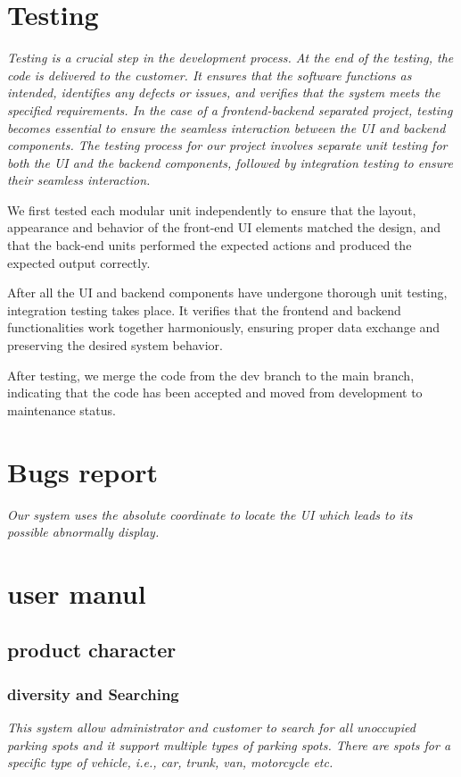 {	\section{Testing}
	{\slshape \selectfont
		Testing is a crucial step in the development process. At the end of the
		testing, the code is delivered to the customer. It ensures that the
		software functions as intended, identifies any defects or issues, and
		verifies that the system meets the specified requirements. In the case
		of a frontend-backend separated project, testing becomes essential to
		ensure the seamless interaction between the UI and backend components.
		The testing process for our project involves separate unit testing for
		both the UI and the backend components, followed by integration testing
		to ensure their seamless interaction.
		
		We first tested each modular unit independently to ensure that the
		layout, appearance and behavior of the front-end UI elements matched
		the design, and that the back-end units performed the expected actions
		and produced the expected output correctly.
		
		After all the UI and backend components have undergone thorough unit
		testing, integration testing takes place. It verifies that the frontend
		and backend functionalities work together harmoniously, ensuring proper
		data exchange and preserving the desired system behavior.
		
		After testing, we merge the code from the dev branch to the main branch,
		indicating that the code has been accepted and moved from development to
		maintenance status.
		
	}
	\section{Bugs report}
	{\slshape \selectfont
		Our system uses the absolute coordinate to locate the UI which leads to its possible abnormally display.
	}
	\newpage
	\section{user manul}
	{\subsection{product character}
	\subsubsection{diversity and Searching}
	{\slshape \selectfont
		 This system allow administrator and customer to search for all unoccupied parking spots and it support multiple types of parking spots. There are spots for a specific type of vehicle, i.e., car, trunk, van, motorcycle etc.
	}
}}
